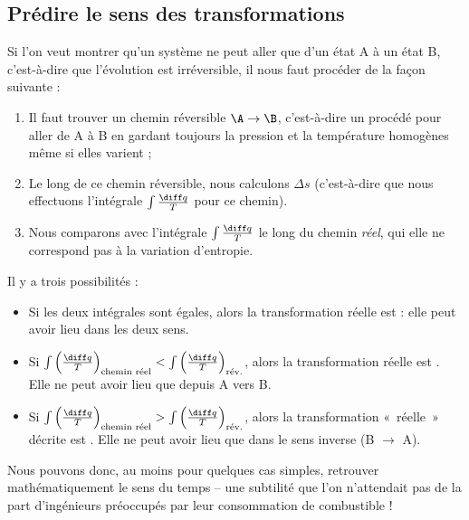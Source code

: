 	\subsection{Prédire le sens des transformations}
	
		Si l’on veut montrer qu’un système ne peut aller que d’un état A à un état B, c’est-à-dire que l’évolution est irréversible, il nous faut procéder de la façon suivante :
	
		\begin{enumerate}
			\item Il faut trouver un chemin réversible $\A \to \B$, c’est-à-dire un procédé pour aller de A à B en gardant toujours la pression et la température homogènes même si elles varient ;
			\item Le long de ce chemin réversible, nous calculons $\Delta s$ (c’est-à-dire que nous effectuons l’intégrale $\int \frac{\diff q}{T} $ pour ce chemin).
			\item Nous comparons avec l’intégrale $\int \frac{\diff q}{T} $ le long du chemin \emph{réel}, qui elle ne correspond pas à la variation d’entropie.
		\end{enumerate}

		Il y a trois possibilités :
			\begin{itemize}
				\item Si les deux intégrales sont égales, alors la transformation réelle est  : elle peut avoir lieu dans les deux sens.
				\item Si $\int \left(\frac{\diff q}{T}\right)_\text{chemin réel} < \int \left(\frac{\diff q}{T}\right)_\text{rév.}$, alors la transformation réelle est . Elle ne peut avoir lieu que depuis A vers B.
				\item Si $\int \left(\frac{\diff q}{T}\right)_\text{chemin réel} > \int \left(\frac{\diff q}{T}\right)_\text{rév.}$, alors la transformation «~réelle~» décrite est . Elle ne peut avoir lieu que dans le sens inverse (B $\to$ A).
			\end{itemize}
		
		Nous pouvons donc, au moins pour quelques cas simples, retrouver mathématiquement le sens du temps -- une subtilité que l’on n’attendait pas de la part d’ingénieurs préoccupés par leur consommation de combustible !

